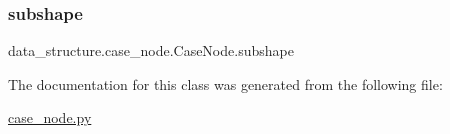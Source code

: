 \subsubsection{\texorpdfstring{subshape}{subshape}}
{\footnotesize\ttfamily data\+\_\+structure.\+case\+\_\+node.\+Case\+Node.\+subshape}



The documentation for this class was generated from the following file\+:\begin{DoxyCompactItemize}
\item 
\hyperlink{case__node_8py}{case\+\_\+node.\+py}\end{DoxyCompactItemize}
